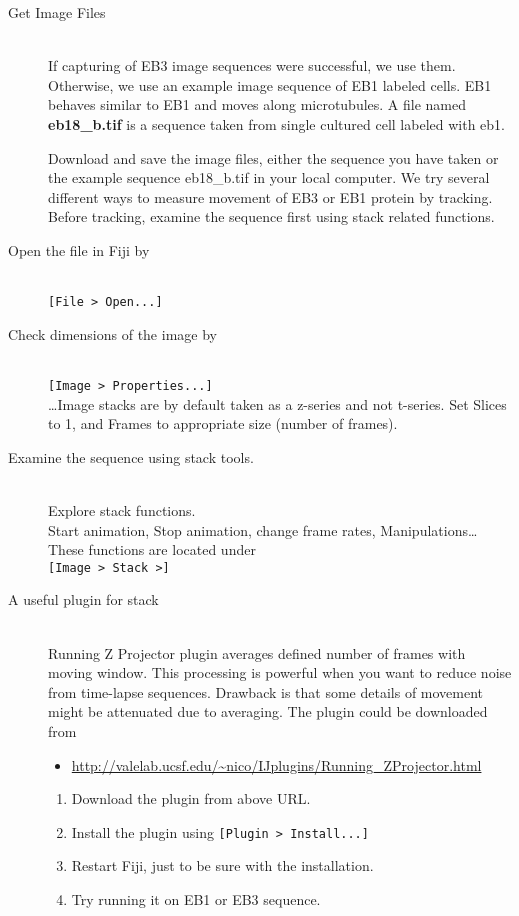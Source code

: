 \documentclass[11pnt]{article}
\begin{document}
\begin{description}

\item[Get Image Files]\hfill\\

If capturing of EB3 image sequences were successful, we use them. Otherwise, we use an example image sequence of EB1 labeled cells. EB1 behaves similar to EB1 and moves along microtubules. A file named \textbf{eb18\_b.tif} is a sequence taken from single cultured cell labeled with eb1. 

Download and save the image files, either the sequence you have taken or the example sequence eb18\_b.tif in your local computer. We try several different ways to measure movement of EB3 or EB1 protein by tracking. Before tracking, examine the sequence first using stack related functions. 

\item[Open the file in Fiji by]\hfill\\

\verb"[File > Open...]"\\

\item[Check dimensions of the image by]\hfill\\
\verb"[Image > Properties...]"\\

\dots Image stacks are by default taken as a z-series and not t-series. Set Slices to 1, and Frames to appropriate size (number of frames).

\item[Examine the sequence using stack tools.]\hfill\\

Explore stack functions. \\
Start animation, Stop animation, change frame rates, Manipulations\dots These functions are located under\hfill\\

\verb"[Image > Stack >]"\\

\item[A useful plugin for stack]\hfill\\

Running Z Projector plugin averages defined number of frames with moving window. This processing is powerful when you want to reduce noise from time-lapse sequences. Drawback is that some details of movement might be attenuated due to averaging. The plugin could be downloaded from
\begin{itemize}
\item\url{http://valelab.ucsf.edu/~nico/IJplugins/Running_ZProjector.html}
\end{itemize}
\begin{enumerate}
\item Download the plugin from above URL.
\item Install the plugin using \verb"[Plugin > Install...]"
\item Restart Fiji, just to be sure with the installation. 
\item Try running it on EB1 or EB3 sequence. 
\end{enumerate}


\end{description}
\end{document}

